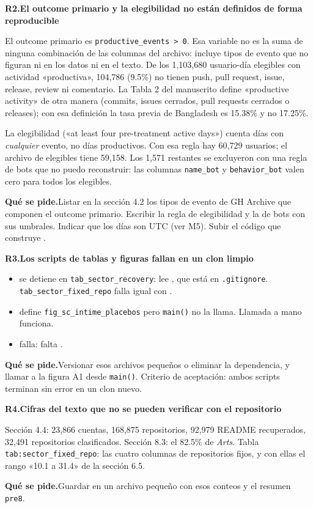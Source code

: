 \documentclass[11pt,a4paper]{article}
\newcommand{\coment}[2]{\medskip\noindent\textbf{#1.\enspace #2}\par\nopagebreak}
\newcommand{\pide}{\par\noindent\textbf{Qué se pide.}\enspace}
\newcommand{\cod}[1]{\texttt{#1}}
\begin{document}
\coment{R2}{El outcome primario y la elegibilidad no están definidos de forma reproducible}
El outcome primario es \cod{productive\_events > 0}. Esa variable no es la suma de ninguna combinación
de las columnas del archivo: incluye tipos de evento que no figuran ni en los datos ni en el texto. De
los 1,103,680 usuario-día elegibles con actividad «productiva», 104,786 (9.5\%) no tienen push, pull
request, issue, release, review ni comentario. La Tabla 2 del manuscrito define «productive activity»
de otra manera (commits, issues cerrados, pull requests cerrados o releases); con esa definición la
tasa previa de Bangladesh es 15.38\% y no 17.25\%.

La elegibilidad («at least four pre-treatment active days») cuenta días con \emph{cualquier} evento,
no días productivos. Con esa regla hay 60,729 usuarios; el archivo de elegibles tiene 59,158. Los 1,571
restantes se excluyeron con una regla de bots que no puedo reconstruir: las columnas \cod{name\_bot} y
\cod{behavior\_bot} valen cero para todos los elegibles.
\pide Listar en la sección 4.2 los tipos de evento de GH Archive que componen el outcome primario.
Escribir la regla de elegibilidad y la de bots con sus umbrales. Indicar que los días son UTC (ver M5).
Subir el código que construye .

\coment{R3}{Los scripts de tablas y figuras fallan en un clon limpio}
\begin{itemize}
\item {} se detiene en \cod{tab\_sector\_recovery}: lee
, que está en \cod{.gitignore}.
\cod{tab\_sector\_fixed\_repo} falla igual con .
\item {} define \cod{fig\_sc\_intime\_placebos} pero
\cod{main()} no la llama. Llamada a mano funciona.
\item {} falla: falta
.
\end{itemize}
\pide Versionar esos archivos pequeños o eliminar la dependencia, y llamar a la figura A1 desde
\cod{main()}. Criterio de aceptación: ambos scripts terminan sin error en un clon nuevo.

\coment{R4}{Cifras del texto que no se pueden verificar con el repositorio}
Sección 4.4: 23,866 cuentas, 168,875 repositorios, 92,979 README recuperados, 32,491 repositorios
clasificados. Sección 8.3: el 82.5\% de \emph{Arts}. Tabla \cod{tab:sector\_fixed\_repo}: las cuatro
columnas de repositorios fijos, y con ellas el rango «10.1 a 31.4» de la sección 6.5.
\pide Guardar en  un archivo pequeño con esos conteos y el resumen
\cod{pre8}.
\end{document}

